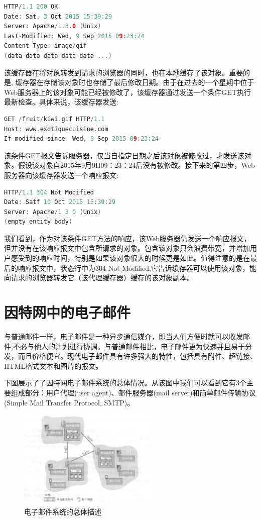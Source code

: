\begin{lstlisting}[language=C++]
HTTP/1.1 200 OK
Date: Sat, 3 Oct 2015 15:39:29
Server: Apache/1.3.0 (Unix)
Last-Modified: Wed, 9 Sep 2015 09:23:24
Content-Type: image/gif
(data data data data data ...)
\end{lstlisting}

    该缓存器在将对象转发到请求的浏览器的同时，也在本地缓存了该对象。重要的是, 缓存器在存储该对象时也存储了最后修改日期。由于在过去的一个星期中位于Web服务器上的该对象可能已经被修改了，该缓存器通过发送一个条件GET执行最新检查。具体来说，该缓存器发送:

\begin{lstlisting}[language=C++]
GET /fruit/kiwi.gif HTTP/1.1
Host: www.exotiquecuisine.com
If-modified-since: Wed, 9 Sep 2015 09:23:24
\end{lstlisting}

    该条件GET报文告诉服务器，仅当自指定日期之后该对象被修改过，才发送该对象。假设该对象自2015年9月9H09：23：24后没有被修改。接下来的第四步，Web服务器向该缓存器发送一个响应报文:

\begin{lstlisting}[language=C++]
HTTP/1.1 304 Not Modified
Date: Satf 10 Oct 2015 15:39:29
Server: Apache/1 3 0 (Unix)
(empty entity body)
\end{lstlisting}

    我们看到，作为对该条件GET方法的响应，该Web服务器仍发送一个响应报文，但并没有在该响应报文中包含所请求的对象。包含该对象只会浪费带宽，并增加用户感受到的响应时间，特别是如果该对象很大的时候更是如此。值得注意的是在最后的响应报文中，状态行中为304 Not Modified,它告诉缓存器可以使用该对象，能向请求的浏览器转发它（该代理缓存器）缓存的该对象副本。

\section{因特网中的电子邮件}

    与普通邮件一样，电子邮件是一种异步通信媒介，即当人们方便时就可以收发邮件,不必与他人的计划进行协调。与普通邮件相比，电子邮件更为快速并且易于分发，而且价格便宜。现代电子邮件具有许多强大的特性，包括具有附件、超链接、HTML格式文本和图片的报文。

    下图展示了了因特网电子邮件系统的总体情况。从该图中我们可以看到它有3个主要组成部分：用户代理(user agent)、邮件服务器(mail server)和简单邮件传输协议(Simple Mail Transfer Protocol, SMTP)。

\begin{figure}[!htbp]
    \centering
    \includegraphics[width=0.6\textwidth]{image/chapter02/电子邮件系统的总体描述.png}
    \caption{电子邮件系统的总体描述}
\end{figure}

